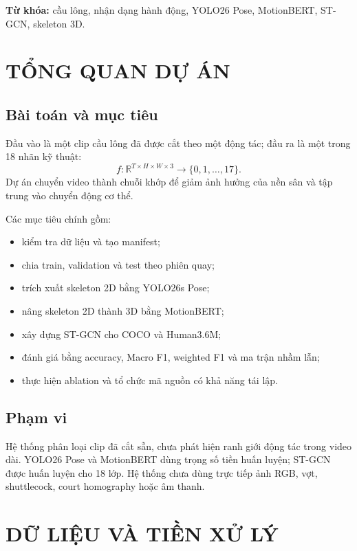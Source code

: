 \documentclass[12pt,a4paper,oneside]{report}
\begin{document}
\noindent\textbf{Từ khóa:} cầu lông, nhận dạng hành động, YOLO26 Pose, MotionBERT, ST-GCN, skeleton 3D.

\tableofcontents
\listoffigures
\listoftables
\clearpage
{}

\chapter{TỔNG QUAN DỰ ÁN}
\section{Bài toán và mục tiêu}

Đầu vào là một clip cầu lông đã được cắt theo một động tác; đầu ra là một trong 18 nhãn kỹ thuật:
\begin{equation}
f:\mathbb{R}^{T\times H\times W\times 3}\rightarrow\{0,1,\ldots,17\}.
\end{equation}
Dự án chuyển video thành chuỗi khớp để giảm ảnh hưởng của nền sân và tập trung vào chuyển động cơ thể.

Các mục tiêu chính gồm:
\begin{itemize}
\item kiểm tra dữ liệu và tạo manifest;
\item chia train, validation và test theo phiên quay;
\item trích xuất skeleton 2D bằng YOLO26s Pose;
\item nâng skeleton 2D thành 3D bằng MotionBERT;
\item xây dựng ST-GCN cho COCO và Human3.6M;
\item đánh giá bằng accuracy, Macro F1, weighted F1 và ma trận nhầm lẫn;
\item thực hiện ablation và tổ chức mã nguồn có khả năng tái lập.
\end{itemize}

\section{Phạm vi}

Hệ thống phân loại clip đã cắt sẵn, chưa phát hiện ranh giới động tác trong video dài. YOLO26 Pose và MotionBERT dùng trọng số tiền huấn luyện; ST-GCN được huấn luyện cho 18 lớp. Hệ thống chưa dùng trực tiếp ảnh RGB, vợt, shuttlecock, court homography hoặc âm thanh.

\chapter{DỮ LIỆU VÀ TIỀN XỬ LÝ}
\end{document}
